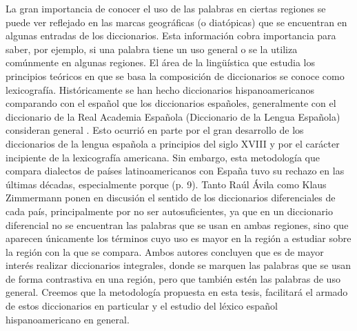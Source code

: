 La gran importancia de conocer el uso de las palabras en ciertas regiones se puede ver reflejado en las marcas geográficas (o diatópicas) que se encuentran en algunas entradas de los diccionarios. Esta información cobra importancia para saber, por ejemplo, si una palabra tiene un uso general o se la utiliza comúnmente en algunas regiones. El área de la lingüística que estudia los principios teóricos en que se basa la composición de diccionarios se conoce como lexicografía. Históricamente se han hecho diccionarios hispanoamericanos comparando con el español que los diccionarios españoles, generalmente con el diccionario de la Real Academia Española (Diccionario de la Lengua Española) consideran general \cite {zimmermann2006fin}. Esto ocurrió en parte por el gran desarrollo de los diccionarios de la lengua española a principios del siglo XVIII y por el carácter incipiente de la lexicografía americana. Sin embargo, esta metodología que compara dialectos de países latinoamericanos con España tuvo su rechazo en las últimas décadas, especialmente porque (p. 9). Tanto Raúl Ávila como Klaus Zimmermann ponen en discusión el sentido de los diccionarios diferenciales de cada país, principalmente por no ser autosuficientes, ya que en un diccionario diferencial no se encuentran las palabras que se usan en ambas regiones, sino que aparecen únicamente los términos cuyo uso es mayor en la región a estudiar sobre la región con la que se compara. Ambos autores concluyen que es de mayor interés realizar diccionarios integrales, donde se marquen las palabras que se usan de forma contrastiva en una región, pero que también estén las palabras de uso general. Creemos que la metodología propuesta en esta tesis, facilitará el armado de estos diccionarios en particular y el estudio del léxico español hispanoamericano en general.\\




